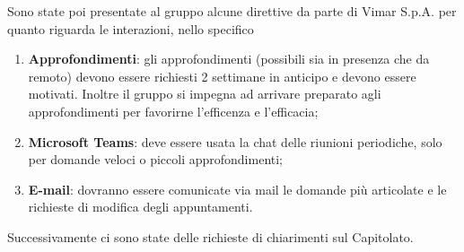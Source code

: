 Sono state poi presentate al gruppo alcune direttive da parte di Vimar S.p.A. per quanto riguarda le interazioni, nello specifico
\begin{enumerate}[label=\Alph*)]
    \item \textbf{Approfondimenti}: gli approfondimenti (possibili sia in presenza che da remoto) devono essere richiesti 2 settimane in anticipo e devono essere motivati. Inoltre il gruppo si impegna ad arrivare preparato agli approfondimenti per favorirne l'efficenza e l'efficacia;

    \item \textbf{Microsoft Teams}: deve essere usata la chat delle riunioni periodiche, solo per domande veloci o piccoli approfondimenti;

     \item \textbf{E-mail}: dovranno essere comunicate via mail le domande più articolate e le richieste di modifica degli appuntamenti. 
    
\end{enumerate}

Successivamente ci sono state delle richieste di chiarimenti sul Capitolato.